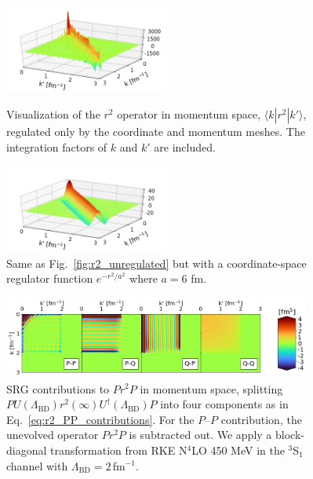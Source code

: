 \documentclass[10pt,aps,prc,floatfix,twocolumn,nofootinbib]{revtex4-1}
\newcommand{\LambdaBD}{{\Lambda_{\text{BD}}}}
\newcommand{\PP}{\ensuremath{P\mbox{--}P}}
\begin{document}
%
\begin{figure}[t!]
    \includegraphics[clip,width=0.48\textwidth]{r2_3d_plot_unregulated.png}%
    \caption{Visualization of the $r^2$ operator in momentum space, $\langle k | r^2 | k'\rangle$, regulated only by the coordinate and momentum meshes.
    The integration factors of $k$ and $k'$ are included.}
    \label{fig:r2_unregulated}
    
\medskip\smallskip

    \includegraphics[clip,width=0.48\textwidth]{r2_3d_plot_regulated_a6.png}%
    \caption{Same as Fig.~\ref{fig:r2_unregulated} but with a coordinate-space regulator function $e^{-r^2/a^2}$ where $a=6$ fm.}
    \label{fig:r2_regulated}
\end{figure}
%
\begin{figure}[htb]
    \includegraphics[clip,width=0.9\textwidth]{r2_srg_changes_kvnn_111_Block-diag.png}%
    \caption{SRG contributions to $P r^2 P$ in momentum space, splitting $PU(\LambdaBD)r^2(\infty)U^{\dagger}(\LambdaBD)P$ into four components as in Eq.~\eqref{eq:r2_PP_contributions}. For the $\PP$ contribution, the unevolved operator $P r^2 P$ is subtracted out. We apply a block-diagonal transformation from RKE N$^4$LO 450 MeV in the $^3$S$_1$ channel with $\LambdaBD=2$\,fm$^{-1}$.}
    \label{fig:r2_srg_changes}
\end{figure}
%
\end{document}
